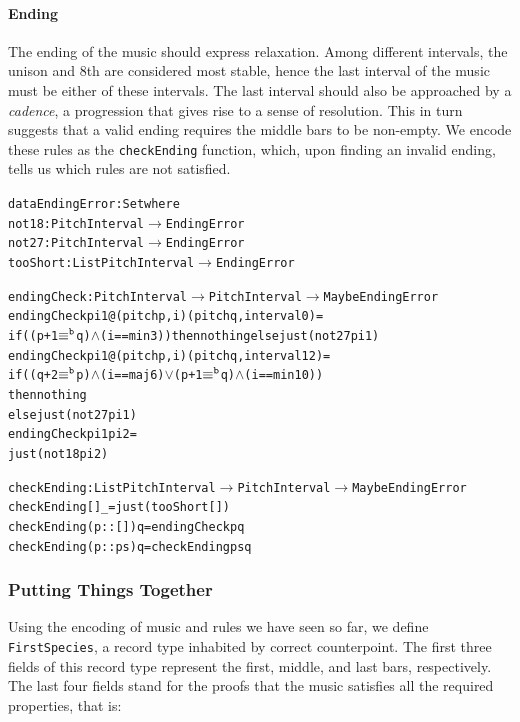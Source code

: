 \paragraph{Ending}

The ending of the music should express relaxation.
Among different intervals, the unison and 8th are considered
most stable, hence the last interval of the music must be either of
these intervals.
The last interval should also be approached by a \emph{cadence},
a progression that gives rise to a sense of resolution.
This in turn suggests that a valid ending requires the middle bars
to be non-empty.
We encode these rules as the \texttt{checkEnding} function, which,
upon finding an invalid ending, tells us which rules are not satisfied.

\begin{alltt}
data EndingError : Set where
  not18    : PitchInterval \(\rightarrow\) EndingError
  not27    : PitchInterval \(\rightarrow\) EndingError
  tooShort : List PitchInterval \(\rightarrow\) EndingError

endingCheck : PitchInterval \(\rightarrow\) PitchInterval \(\rightarrow\) Maybe EndingError
endingCheck pi1@(pitch p , i) (pitch q , interval 0)  = 
  if ((p + 1 \(\equiv\sp{\mathtt{b}}\) q) \(\wedge\) (i == min3)) then nothing else just (not27 pi1)
endingCheck pi1@(pitch p , i) (pitch q , interval 12) =
  if ((q + 2 \(\equiv\sp{\mathtt{b}}\) p) \(\wedge\) (i == maj6) \(\vee\) (p + 1 \(\equiv\sp{\mathtt{b}}\) q) \(\wedge\) (i == min10))
  then nothing
  else just (not27 pi1)
endingCheck pi1               pi2                     =
  just (not18 pi2)

checkEnding : List PitchInterval \(\rightarrow\) PitchInterval \(\rightarrow\) Maybe EndingError
checkEnding []        \_ = just (tooShort [])
checkEnding (p :: []) q = endingCheck p q
checkEnding (p :: ps) q = checkEnding ps q
\end{alltt}

\subsubsection{Putting Things Together}

Using the encoding of music and rules we have seen so far, we define
\texttt{FirstSpecies}, a record type inhabited by correct counterpoint.
The first three fields of this record type represent the first, middle,
and last bars, respectively.
The last four fields stand for the proofs that the music satisfies all
the required properties, that is:

